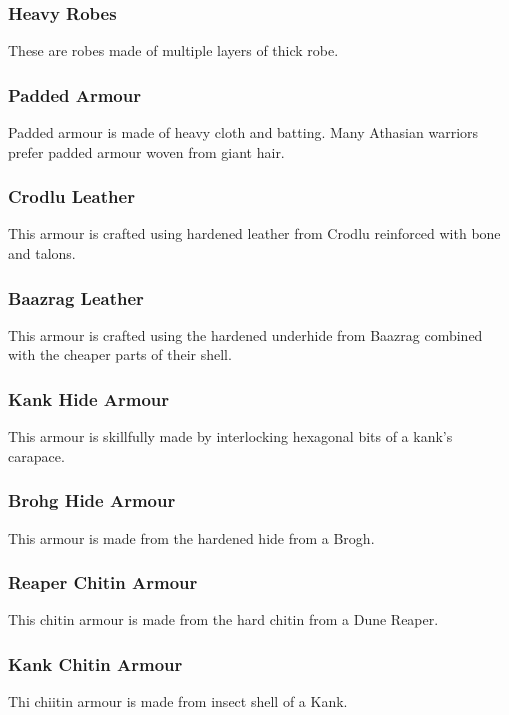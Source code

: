 \begin{multicols}{2}

\subsubsection{Heavy Robes}
\label{itmamr:heavyrobes}
These are robes made of multiple layers of thick robe.

\subsubsection{Padded Armour}
\label{itmamr:padded}
Padded armour is made of heavy cloth and batting. Many Athasian warriors prefer padded armour woven from giant hair.

\subsubsection{Crodlu Leather}
\label{itmamr:crodluleather}
This armour is crafted using hardened leather from Crodlu reinforced with bone and talons.

\subsubsection{Baazrag Leather}
\label{itmamr:baazragleather}
This armour is crafted using the hardened underhide from Baazrag combined with the cheaper parts of their shell.

\subsubsection{Kank Hide Armour}
\label{itmamr:kankhide}
This armour is skillfully made by interlocking hexagonal bits of a kank’s carapace.

\subsubsection{Brohg Hide Armour}
\label{itmamr:brohghide}
This armour is made from the hardened hide from a Brogh.

\subsubsection{Reaper Chitin Armour}
\label{itmamr:reaperchitin}
This chitin armour is made from the hard chitin from a Dune Reaper.

\subsubsection{Kank Chitin Armour}
\label{itmamr:kreenchitin}
Thi chiitin armour is made from insect shell of a Kank.


\end{multicols}
